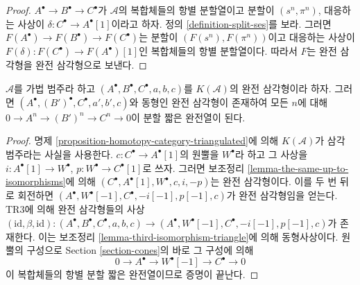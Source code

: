 \begin{proof}
$A^\bullet \to B^\bullet \to C^\bullet$가 $\mathcal{A}$의 복합체들의
항별 분할열이고 분할이 $(s^n, \pi^n)$, 대응하는 사상이
$\delta : C^\bullet \to A^\bullet[1]$이라고 하자. 정의
\ref{definition-split-ses}를 보라. 그러면
$F(A^\bullet) \to F(B^\bullet) \to F(C^\bullet)$는 분할이
$(F(s^n), F(\pi^n))$이고 대응하는 사상이
$F(\delta) : F(C^\bullet) \to F(A^\bullet)[1]$인 복합체들의
항별 분할열이다. 따라서 $F$는 완전 삼각형을 완전 삼각형으로
보낸다.
\end{proof}

\begin{lemma}
\label{lemma-improve-distinguished-triangle-homotopy}
$\mathcal{A}$를 가법 범주라 하고
$(A^\bullet, B^\bullet, C^\bullet, a, b, c)$를
$K(\mathcal{A})$의 완전 삼각형이라 하자. 그러면
$(A^\bullet, (B')^\bullet, C^\bullet, a', b', c)$와 동형인 완전
삼각형이 존재하여 모든 $n$에 대해
$0 \to A^n \to (B')^n \to C^n \to 0$이 분할 짧은 완전열이 된다.
\end{lemma}

\begin{proof}
명제 \ref{proposition-homotopy-category-triangulated}에 의해
$K(\mathcal{A})$가 삼각 범주라는 사실을 사용한다. $c : C^\bullet \to
A^\bullet[1]$의 원뿔을 $W^\bullet$라 하고 그 사상을
$i : A^\bullet[1] \to W^\bullet$, $p : W^\bullet \to C^\bullet[1]$로
쓰자. 그러면 보조정리 \ref{lemma-the-same-up-to-isomorphisms}에 의해
$(C^\bullet, A^\bullet[1], W^\bullet, c, i, -p)$는 완전 삼각형이다.
이를 두 번 뒤로 회전하면
$(A^\bullet, W^\bullet[-1], C^\bullet, -i[-1], p[-1], c)$가
완전 삼각형임을 얻는다. TR3에 의해 완전 삼각형들의 사상
$(\text{id}, \beta, \text{id}) :
(A^\bullet, B^\bullet, C^\bullet, a, b, c) \to
(A^\bullet, W^\bullet[-1], C^\bullet, -i[-1], p[-1], c)$가
존재한다. 이는 보조정리
\ref{lemma-third-isomorphism-triangle}에 의해 동형사상이다.
원뿔의 구성으로 Section \ref{section-cones}의 바로 그 구성에 의해
$$
0 \to A^\bullet \to W^\bullet[-1] \to C^\bullet \to 0
$$
이 복합체들의 항별 분할 짧은 완전열이므로 증명이 끝난다.
\end{proof}

